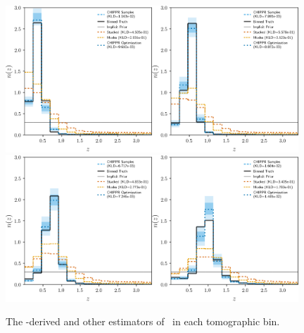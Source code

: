 \begin{figure}
	\begin{center}
		\includegraphics[width=0.49\textwidth]{figures/chippr/0single_lsst_lin_estimators.png}\includegraphics[width=0.49\textwidth]{figures/chippr/1single_lsst_lin_estimators.png}\\
		\includegraphics[width=0.49\textwidth]{figures/chippr/2single_lsst_lin_estimators.png}\includegraphics[width=0.49\textwidth]{figures/chippr/3single_lsst_lin_estimators.png}
		\caption{The \chippr-derived and other estimators of \nz\ in each tomographic bin.}
	\end{center}
\end{figure}


